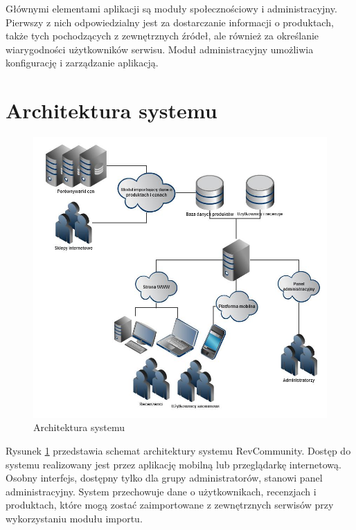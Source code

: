 Głównymi elementami aplikacji są moduły społecznościowy i administracyjny. Pierwszy z nich odpowiedzialny jest za dostarczanie informacji o produktach, także tych pochodzących z zewnętrznych źródeł, ale również za określanie wiarygodności użytkowników serwisu. Moduł administracyjny umożliwia konfigurację i zarządzanie aplikacją. 
\newpage
\section{Architektura systemu}

\begin{figure}[H]
	\centering
	\includegraphics[width=\textwidth]{images/architektura.jpg}
	\caption{Architektura systemu}
	\label{fig:architektura}
\end{figure}
Rysunek \ref{fig:architektura} przedstawia schemat architektury systemu RevCommunity. Dostęp do systemu realizowany jest przez aplikację mobilną lub przeglądarkę internetową. Osobny interfejs, dostępny tylko dla grupy administratorów, stanowi panel administracyjny. System przechowuje dane o użytkownikach, recenzjach i produktach, które mogą zostać zaimportowane z zewnętrznych serwisów przy wykorzystaniu modułu importu. 

\newpage

